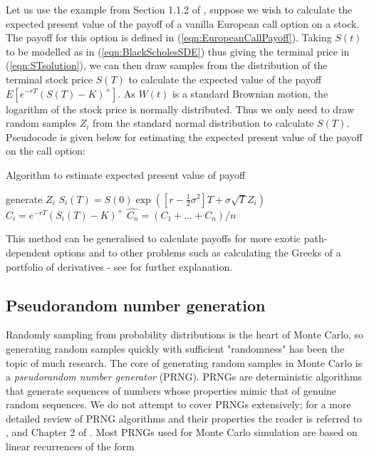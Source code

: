 Let us use the example from Section 1.1.2 of \cite{glasserman2004monte}, suppose we wish to calculate the expected present value of the payoff of a vanilla European call option on a stock. The payoff for this option is defined in (\ref{eqn:EuropeanCallPayoff}). Taking \(S(t)\) to be modelled as in (\ref{eqn:BlackScholesSDE}) thus giving the terminal price in (\ref{eqn:STsolution}), we can then draw samples from the distribution of the terminal stock price \(S(T)\) to calculate the expected value of the payoff \(E[e^{-rT}(S(T) - K)^+]\). As \(W(t)\) is a standard Brownian motion, the logarithm of the stock price is normally distributed. Thus we only need to draw random samples \(Z_i\) from the standard normal distribution to calculate \(S(T)\). Pseudocode is given below for estimating the expected present value of the payoff on the call option:

\begin{algorithm}[hbt!]
\caption{Algorithm to estimate expected present value of payoff}\label{alg:EstimateExpectedPayoff}
\begin{algorithmic}[1]
    \State generate $Z_i$
    \State $S_i(T) = S(0)\exp{([r - \frac{1}{2}\sigma^2]T + \sigma \sqrt{T}Z_i)}$
    \State $C_i = e^{-rT}(S_i(T) - K)^+$
\EndFor
\State $\hat{C_n} = (C_1 + \dots + C_n) / n$
\end{algorithmic}
\end{algorithm}

This method can be generalised to calculate payoffs for more exotic path-dependent options and to other problems such as calculating the Greeks of a portfolio of derivatives - see \cite{giles2007monte} for further explanation.

\subsection{Pseudorandom number generation} \label{sec:prng}
Randomly sampling from probability distributions is the heart of Monte Carlo, so generating random samples quickly with sufficient "randomness" has been the topic of much research. The core of generating random samples in Monte Carlo is a \textit{pseudorandom number generator} (PRNG). PRNGs are deterministic algorithms that generate sequences of numbers whose properties mimic that of genuine random sequences. We do not attempt to cover PRNGs extensively; for a more detailed review of PRNG algorithms and their properties the reader is referred to \cite{l2010pseudorandom}, \cite{gu2016statistical} and Chapter 2 of \cite{glasserman2004monte}.
Most PRNGs used for Monte Carlo simulation are based on linear recurrences of the form

